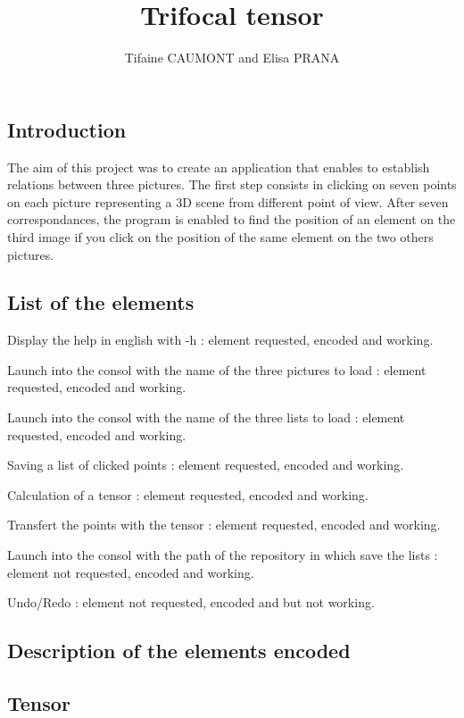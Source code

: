 \documentclass{report}
\begin{document}
\title{Trifocal tensor}
\author{Tifaine CAUMONT and Elisa PRANA}
\maketitle

\tableofcontents
\newpage

\textcolor{title}{\section*{Introduction}}
The aim of this project was to create an application that enables to establish relations between three pictures. The first step consists in clicking on seven points on each picture representing a 3D scene from different point of view. After seven correspondances, the program is enabled to find the position of an element on the third image if you click on the position of the same element on the two others pictures. 

\textcolor{title}{\section{List of the elements}}

\begin{list}{•}{•}
\item 
Display the help in english with -h : element requested, encoded and working.  
\item
Launch into the consol with the name of the three pictures to load : element requested, encoded and working. 
\item
Launch into the consol with the name of the three lists to load : element requested, encoded and working. 
\item
Saving a list of clicked points : element requested, encoded and working.  
\item
Calculation of a tensor : element requested, encoded and working. 
\item
Transfert the points with the tensor : element requested, encoded and working.
\item 
Launch into the consol with the path of the repository in which save the lists : element not requested, encoded and working.  
\item 
Undo/Redo : element not requested, encoded and but not working.  

\end{list}

\textcolor{title}{\section{Description of the elements encoded}}
\textcolor{subtitle}{\subsection{Tensor}}
\end{document}
